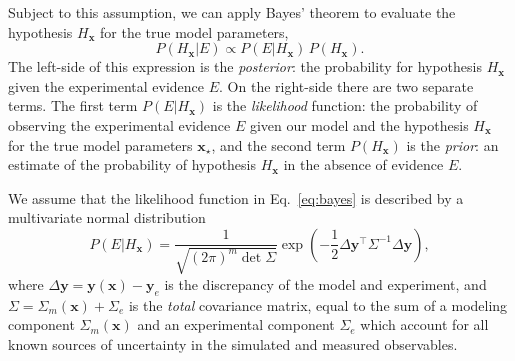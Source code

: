 \documentclass[aps,prc,reprint,amsmath,nofootinbib]{revtex4-1}
\newcommand{\xv}{\mathbf x}
\newcommand{\yv}{\mathbf y}
\begin{document}
Subject to this assumption, we can apply Bayes' theorem to evaluate the hypothesis $H_\xv$ for the true model parameters,
\begin{equation}
  \label{eq:bayes}
  P(H_\xv | E) \propto P(E | H_\xv)\, P(H_\xv).
\end{equation}
The left-side of this expression is the \emph{posterior}: the probability for hypothesis $H_\xv$ given the experimental evidence $E$.
On the right-side there are two separate terms.
The first term $P(E | H_\xv)$ is the \emph{likelihood} function: the probability of observing the experimental evidence $E$ given our model and the hypothesis $H_\xv$ for the true model parameters $\xv_\star$, and the second term $P(H_\xv)$ is the \emph{prior}: an estimate of the probability of hypothesis $H_\xv$ in the absence of evidence $E$.

We assume that the likelihood function in Eq.~\eqref{eq:bayes} is described by a multivariate normal distribution
\begin{equation}
  \label{eq:likelihood}
  P(E | H_\xv) = \frac{1}{\sqrt{(2\pi)^m \det \Sigma}} \exp \left ( -\frac{1}{2}\Delta\yv^\intercal \Sigma^{-1} \Delta\yv \right ),
\end{equation}
where $\Delta\yv = \yv(\xv) - \yv_e$ is the discrepancy of the model and experiment, and $\Sigma = \Sigma_m(\xv) + \Sigma_e$ is the \emph{total} covariance matrix, equal to the sum of a modeling component $\Sigma_m(\xv)$ and an experimental component $\Sigma_e$ which account for all known sources of uncertainty in the simulated and measured observables.
\end{document}
